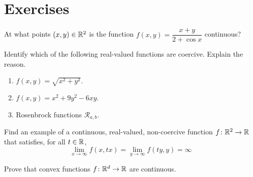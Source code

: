 
\section*{Exercises}
\begin{problem}
At what points $(x,y) \in \mathbb{R}^2$ is the function $f(x,y) = \dfrac{x+y}{2+\cos x}$ continuous?
\end{problem}

\begin{problem}
Identify which of the following real-valued functions are coercive.  Explain the reason.
\begin{enumerate}
	\item $f(x,y) = \sqrt{x^2+y^2}$.
	\item $f(x,y) = x^2 + 9y^2 - 6xy$.
	\item Rosenbrock functions $\mathcal{R}_{a,b}$.
\end{enumerate}
\end{problem}

\begin{problem}
Find an example of a continuous, real-valued, non-coercive function $f\colon \mathbb{R}^2 \to \mathbb{R}$ that satisfies, for all $t \in \mathbb{R}$,
\begin{equation*}
\lim_{x \to \infty} f(x, tx) = \lim_{y \to \infty} f(ty, y) = \infty
\end{equation*}
\end{problem}

\begin{problem}\label{problem:ConvexIsContinuous}
Prove that convex functions $f \colon \mathbb{R}^d \to \mathbb{R}$ are continuous.
\end{problem}